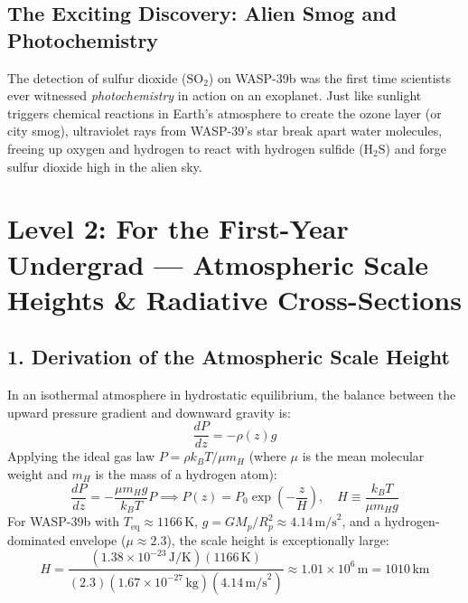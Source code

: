 \documentclass[11pt,a4paper]{article}
\begin{document}
\subsection*{The Exciting Discovery: Alien Smog and Photochemistry}
The detection of sulfur dioxide ($\mathrm{SO_2}$) on WASP-39b was the first time scientists ever witnessed \textit{photochemistry} in action on an exoplanet. Just like sunlight triggers chemical reactions in Earth's atmosphere to create the ozone layer (or city smog), ultraviolet rays from WASP-39's star break apart water molecules, freeing up oxygen and hydrogen to react with hydrogen sulfide ($\mathrm{H_2S}$) and forge sulfur dioxide high in the alien sky.

\newpage

\section*{Level 2: For the First-Year Undergrad — Atmospheric Scale Heights \& Radiative Cross-Sections}

\subsection*{1. Derivation of the Atmospheric Scale Height}
In an isothermal atmosphere in hydrostatic equilibrium, the balance between the upward pressure gradient and downward gravity is:
\begin{equation}
\frac{dP}{dz} = -\rho(z) g
\end{equation}
Applying the ideal gas law $P = \rho k_B T / \mu m_H$ (where $\mu$ is the mean molecular weight and $m_H$ is the mass of a hydrogen atom):
\begin{equation}
\frac{dP}{dz} = -\frac{\mu m_H g}{k_B T} P \implies P(z) = P_0 \exp\left(-\frac{z}{H}\right), \quad H \equiv \frac{k_B T}{\mu m_H g}
\end{equation}
For WASP-39b with $T_{\text{eq}} \approx 1166\,\text{K}$, $g = G M_p / R_p^2 \approx 4.14\,\text{m/s}^2$, and a hydrogen-dominated envelope ($\mu \approx 2.3$), the scale height is exceptionally large:
\begin{equation}
H = \frac{(1.38 \times 10^{-23}\,\text{J/K})(1166\,\text{K})}{(2.3)(1.67 \times 10^{-27}\,\text{kg})(4.14\,\text{m/s}^2)} \approx 1.01 \times 10^6\,\text{m} = 1010\,\text{km}
\end{equation}
\end{document}
